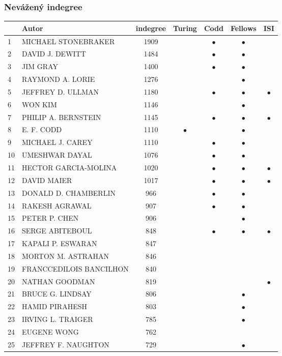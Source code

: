 \documentclass[12pt,titlepage]{report}
\begin{document}
\subsubsection{Nevážený indegree}
\begin{center}
\begin{tabular}{|l|l|c|c|c|c|c|}
\hline
& {\bf Autor} & {\bf indegree} & {\bf Turing} & {\bf Codd} & {\bf Fellows} & {\bf ISI} \\
\hline
1  & MICHAEL STONEBRAKER & 1909&         &$\bullet$&$\bullet$& \\
\hline
2  & DAVID J. DEWITT & 1484&         &$\bullet$&$\bullet$& \\
\hline
3  & JIM GRAY & 1400&         &$\bullet$&$\bullet$& \\
\hline
4  & RAYMOND A. LORIE & 1276&         &         &$\bullet$& \\
\hline
5  & JEFFREY D. ULLMAN & 1180&         &$\bullet$&$\bullet$&$\bullet$ \\
\hline
6  & WON KIM & 1146&         &         &$\bullet$& \\
\hline
7  & PHILIP A. BERNSTEIN & 1145&         &$\bullet$&$\bullet$&$\bullet$ \\
\hline
8  & E. F. CODD & 1110&$\bullet$&         &$\bullet$& \\
\hline
9  & MICHAEL J. CAREY & 1110&         &$\bullet$&$\bullet$& \\
\hline
10 & UMESHWAR DAYAL & 1076&         &$\bullet$&$\bullet$& \\
\hline
11 & HECTOR GARCIA-MOLINA & 1020&         &$\bullet$&$\bullet$&$\bullet$ \\
\hline
12 & DAVID MAIER & 1017&         &$\bullet$&$\bullet$&$\bullet$ \\
\hline
13 & DONALD D. CHAMBERLIN & 966&         &$\bullet$&$\bullet$& \\
\hline
14 & RAKESH AGRAWAL & 907&         &$\bullet$&$\bullet$& \\
\hline
15 & PETER P. CHEN & 906&         &         &$\bullet$& \\
\hline
16 & SERGE ABITEBOUL & 848&         &$\bullet$&$\bullet$&$\bullet$ \\
\hline
17 & KAPALI P. ESWARAN & 847&         &         &         & \\
\hline
18 & MORTON M. ASTRAHAN & 846&         &         &         & \\
\hline
19 & FRANCCEDILOIS BANCILHON & 840&         &         &         & \\
\hline
20 & NATHAN GOODMAN & 819&         &         &         &$\bullet$ \\
\hline
21 & BRUCE G. LINDSAY & 806&         &         &$\bullet$& \\
\hline
22 & HAMID PIRAHESH & 803&         &         &$\bullet$& \\
\hline
23 & IRVING L. TRAIGER & 785&         &         &$\bullet$& \\
\hline
24 & EUGENE WONG & 762&         &         &         & \\
\hline
25 & JEFFREY F. NAUGHTON & 729&         &         &$\bullet$& \\
\hline
\end{tabular}
\end{center}
\end{document}
